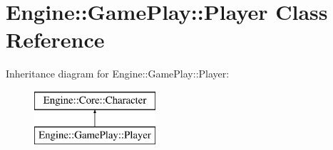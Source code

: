 \hypertarget{class_engine_1_1_game_play_1_1_player}{}\section{Engine\+:\+:Game\+Play\+:\+:Player Class Reference}
\label{class_engine_1_1_game_play_1_1_player}
Inheritance diagram for Engine\+:\+:Game\+Play\+:\+:Player\+:\begin{figure}[H]
\begin{center}
\leavevmode
\includegraphics[height=2.000000cm]{class_engine_1_1_game_play_1_1_player}
\end{center}
\end{figure}
